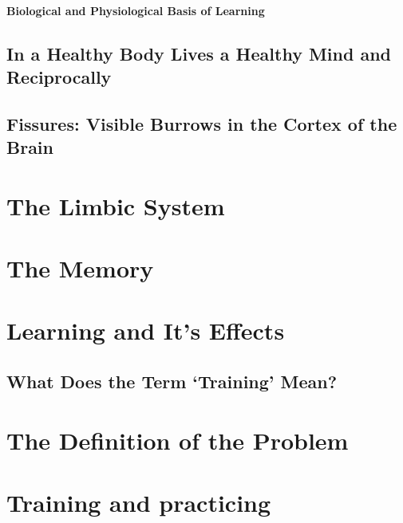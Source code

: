 \documentclass[../main.tex]{subfiles}
\begin{document}
\subsubsection{Biological and Physiological Basis of Learning}



\section{In a Healthy Body Lives a Healthy Mind and Reciprocally}



\section{Fissures: Visible Burrows in the Cortex of the Brain}



\chapter{The Limbic System}



\chapter{The Memory}


 
\chapter{Learning and It's Effects}

\section{What Does the Term `Training' Mean?}


  
\chapter{The Definition of the Problem}\label{Le:problem}



\chapter{Training and practicing}
\end{document}
